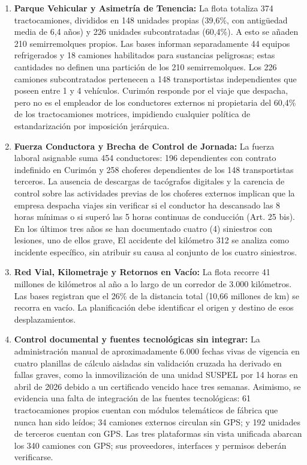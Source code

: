 \begin{enumerate}
  \item \textbf{Parque Vehicular y Asimetría de Tenencia:} La flota totaliza 374 tractocamiones, divididos en 148 unidades propias (39,6\%, con antigüedad media de 6,4 años) y 226 unidades subcontratadas (60,4\%). A esto se añaden 210 semirremolques propios. Las bases informan separadamente 44 equipos refrigerados y 18 camiones habilitados para sustancias peligrosas; estas cantidades no definen una partición de los 210 semirremolques. Los 226 camiones subcontratados pertenecen a 148 transportistas independientes que poseen entre 1 y 4 vehículos. Curimón responde por el viaje que despacha, pero no es el empleador de los conductores externos ni propietaria del 60,4\% de los tractocamiones motrices, impidiendo cualquier política de estandarización por imposición jerárquica.
  \item \textbf{Fuerza Conductora y Brecha de Control de Jornada:} La fuerza laboral asignable suma 454 conductores: 196 dependientes con contrato indefinido en Curimón y 258 choferes dependientes de los 148 transportistas terceros. La ausencia de descargas de tacógrafos digitales y la carencia de control sobre las actividades previas de los choferes externos implican que la empresa despacha viajes sin verificar si el conductor ha descansado las 8 horas mínimas o si superó las 5 horas continuas de conducción (Art. 25 bis). En los últimos tres años se han documentado cuatro (4) siniestros con lesiones, uno de ellos grave, El accidente del kilómetro 312 se analiza como incidente específico, sin atribuir su causa al conjunto de los cuatro siniestros.
  \item \textbf{Red Vial, Kilometraje y Retornos en Vacío:} La flota recorre 41 millones de kilómetros al año a lo largo de un corredor de 3.000 kilómetros. Las bases registran que el 26\% de la distancia total (10,66 millones de km) se recorra en vacío. La planificación debe identificar el origen y destino de esos desplazamientos.
  \item \textbf{Control documental y fuentes tecnológicas sin integrar:} La administración manual de aproximadamente 6.000 fechas vivas de vigencia en cuatro planillas de cálculo aisladas sin validación cruzada ha derivado en fallas graves, como la inmovilización de una unidad SUSPEL por 14 horas en abril de 2026 debido a un certificado vencido hace tres semanas. Asimismo, se evidencia una falta de integración de las fuentes tecnológicas: 61 tractocamiones propios cuentan con módulos telemáticos de fábrica que nunca han sido leídos; 34 camiones externos circulan sin GPS; y 192 unidades de terceros cuentan con GPS. Las tres plataformas sin vista unificada abarcan los 340 camiones con GPS; sus proveedores, interfaces y permisos deberán verificarse.

\end{enumerate}
